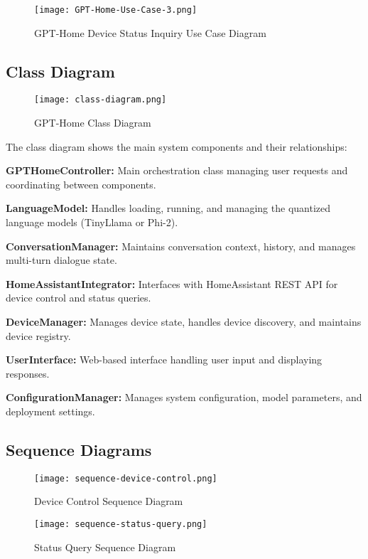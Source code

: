 \documentclass[12pt]{article}
\begin{document}
\begin{figure}[h]
\centering
\texttt{[image: GPT-Home-Use-Case-3.png]}
\caption{GPT-Home Device Status Inquiry Use Case Diagram}
\label{fig:usecase3}
\end{figure}

\subsection{Class Diagram}

\begin{figure}[h!]
\centering
\texttt{[image: class-diagram.png]}
\caption{GPT-Home Class Diagram}
\label{fig:class}
\end{figure}

The class diagram shows the main system components and their relationships:

\textbf{GPTHomeController:} Main orchestration class managing user requests and coordinating between components.

\textbf{LanguageModel:} Handles loading, running, and managing the quantized language models (TinyLlama or Phi-2).

\textbf{ConversationManager:} Maintains conversation context, history, and manages multi-turn dialogue state.

\textbf{HomeAssistantIntegrator:} Interfaces with HomeAssistant REST API for device control and status queries.

\textbf{DeviceManager:} Manages device state, handles device discovery, and maintains device registry.

\textbf{UserInterface:} Web-based interface handling user input and displaying responses.

\textbf{ConfigurationManager:} Manages system configuration, model parameters, and deployment settings.

\subsection{Sequence Diagrams}

\begin{figure}[h!]
\centering
\texttt{[image: sequence-device-control.png]}
\caption{Device Control Sequence Diagram}
\label{fig:seq-control}
\end{figure}

\begin{figure}[h!]
\centering
\texttt{[image: sequence-status-query.png]}
\caption{Status Query Sequence Diagram}
\label{fig:seq-status}
\end{figure}
\end{document}
